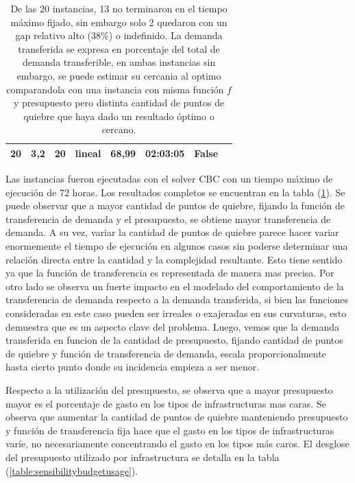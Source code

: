 \documentclass{article}
\begin{document}
\begin{table}
\begin{tabular}{cccccccc}
        20 & 3,2 & 20 & lineal & 68,99 & 02:03:05 & False &  \\
        \bottomrule
    \end{tabular}
      \caption{De las 20 instancias, 13 no terminaron en el tiempo máximo fijado, sin embargo solo 2 quedaron con un gap relativo alto (38\%) o indefinido. La demanda transferida se expresa en porcentaje del total de demanda transferible, en ambas instancias sin embargo, se puede estimar su cercania al optimo comparandola con una instancia con misma función $f$ y presupuesto pero distinta cantidad de puntos de quiebre que haya dado un resultado óptimo o cercano.} \label{table:sensibilityresults}
  \end{table}

  Las instancias fueron ejecutadas con el solver CBC con un tiempo máximo de ejecución de 72 horas. Los resultados completos se encuentran en la tabla (\ref{table:sensibilityresults}). Se puede observar que a mayor cantidad de puntos de quiebre, fijando la función de transferencia de demanda y el presupuesto, se obtiene mayor transferencia de demanda. A su vez, variar la cantidad de puntos de quiebre parece hacer variar enormemente el tiempo de ejecución en algunos casos sin poderse determinar una relación directa entre la cantidad y la complejidad resultante. Esto tiene sentido ya que la función de transferencia es representada de manera mas precisa. Por otro lado se observa un fuerte impacto en el modelado del comportamiento de la transferencia de demanda respecto a la demanda transferida, si bien las funciones consideradas en este caso pueden ser irreales o exajeradas en sus curvaturas, esto demuestra que es un aspecto clave del problema. Luego, vemos que la demanda transferida en funcion de la cantidad de presupuesto, fijando cantidad de puntos de quiebre y función de transferencia de demanda, escala proporcionalmente hasta cierto punto donde su incidencia empieza a ser menor.

  Respecto a la utilización del presupuesto, se observa que a mayor presupuesto mayor es el porcentaje de gasto en los tipos de infrastructuras mas caras. Se observa que aumentar la cantidad de puntos de quiebre manteniendo presupuesto y función de transferencia fija hace que el gasto en los tipos de infrastructuras varíe, no necesariamente concentrando el gasto en los tipos más caros. El desglose del presupuesto utilizado por infrastructura se detalla en la tabla (\ref{table:sensibilitybudgetusage}).
\end{document}
